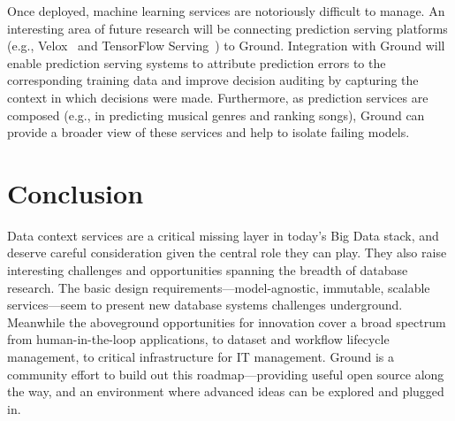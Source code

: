 \documentclass{cidr-2017}
\begin{document}
Once deployed, machine learning services are notoriously difficult to manage.  
An interesting area of future research will be connecting prediction serving platforms (e.g., Velox~\cite{Crankshaw15} and TensorFlow Serving~\cite{tfserving}) to Ground.
Integration with Ground will enable prediction serving systems to attribute prediction errors to the corresponding training data and improve decision auditing by capturing the context in which decisions were made.
Furthermore, as prediction services are composed (e.g., in predicting musical genres and ranking songs), Ground can provide a broader view of these services and help to isolate failing models. 












\smallitembot


\section{Conclusion}
\label{sec:conclusion}
Data context services are a critical missing layer in today's Big Data stack, and deserve careful consideration given the central role they can play. 
They also raise interesting challenges and opportunities spanning the breadth of database research. 
The basic design requirements---model-agnostic, immutable, scalable services---seem to present new database systems challenges underground. 
Meanwhile the aboveground opportunities for innovation cover a broad spectrum from human-in-the-loop applications, to dataset and workflow lifecycle management, to critical infrastructure for IT management. 
Ground is a community effort to build out this roadmap---providing useful open source along the way, and an environment where advanced ideas can be explored and plugged in.


\end{document}
